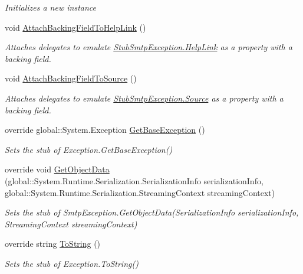 \begin{DoxyCompactItemize}
\begin{DoxyCompactList}\small\item\em Initializes a new instance\end{DoxyCompactList}\item 
void \hyperlink{class_system_1_1_net_1_1_mail_1_1_fakes_1_1_stub_smtp_exception_aa13ee810be1cc666f9ad45a7007172bb}{Attach\-Backing\-Field\-To\-Help\-Link} ()
\begin{DoxyCompactList}\small\item\em Attaches delegates to emulate \hyperlink{class_system_1_1_net_1_1_mail_1_1_fakes_1_1_stub_smtp_exception_aa5a4d890e41b5c2509e0fd24ac7fe00c}{Stub\-Smtp\-Exception.\-Help\-Link} as a property with a backing field.\end{DoxyCompactList}\item 
void \hyperlink{class_system_1_1_net_1_1_mail_1_1_fakes_1_1_stub_smtp_exception_a921b48e331b21de3adfe2ac0d7d074e7}{Attach\-Backing\-Field\-To\-Source} ()
\begin{DoxyCompactList}\small\item\em Attaches delegates to emulate \hyperlink{class_system_1_1_net_1_1_mail_1_1_fakes_1_1_stub_smtp_exception_a41531ca820d13cc29cbdef53e9dcafca}{Stub\-Smtp\-Exception.\-Source} as a property with a backing field.\end{DoxyCompactList}\item 
override global\-::\-System.\-Exception \hyperlink{class_system_1_1_net_1_1_mail_1_1_fakes_1_1_stub_smtp_exception_a26c93ed948791f22bc4357a2947046bb}{Get\-Base\-Exception} ()
\begin{DoxyCompactList}\small\item\em Sets the stub of Exception.\-Get\-Base\-Exception()\end{DoxyCompactList}\item 
override void \hyperlink{class_system_1_1_net_1_1_mail_1_1_fakes_1_1_stub_smtp_exception_abfd4a32f5e86ac2266ee1b761a546841}{Get\-Object\-Data} (global\-::\-System.\-Runtime.\-Serialization.\-Serialization\-Info serialization\-Info, global\-::\-System.\-Runtime.\-Serialization.\-Streaming\-Context streaming\-Context)
\begin{DoxyCompactList}\small\item\em Sets the stub of Smtp\-Exception.\-Get\-Object\-Data(\-Serialization\-Info serialization\-Info, Streaming\-Context streaming\-Context)\end{DoxyCompactList}\item 
override string \hyperlink{class_system_1_1_net_1_1_mail_1_1_fakes_1_1_stub_smtp_exception_a2b5620038d35b5e479cb339eb1ffefc8}{To\-String} ()
\begin{DoxyCompactList}\small\item\em Sets the stub of Exception.\-To\-String()\end{DoxyCompactList}\end{DoxyCompactItemize}
